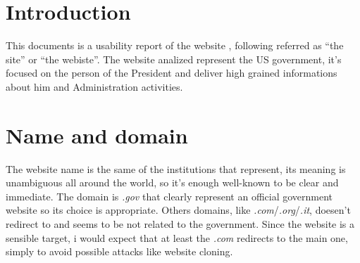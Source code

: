 \documentclass[
10pt, %
a4paper, %
oneside, %
headinclude,footinclude, %
BCOR5mm, %
]{scrartcl}
\begin{document}


{\let\thefootnote\relax{}}


\newpage %


\section{Introduction}
	This documents is a usability report of the website \thesite{}, following referred as ``the site'' or ``the webiste''. The website analized represent the US government, it's focused on the person of the President and deliver high grained informations about him and Administration activities.  
 

\section{Name and domain}

The website name is the same of the institutions that represent, its meaning is unambiguous all around the world, so it's enough well-known to be clear and immediate. The domain is \emph{.gov} that clearly represent an official government website so its choice is appropriate. Others domains, like \emph{.com}/\emph{.org}/\emph{.it}, doesen't redirect to \thesite{} and seems to be not related to the government. Since the website is a sensible target, i would expect that at least the \emph{.com} redirects to the main one, simply to avoid possible attacks like website cloning.
\end{document}
